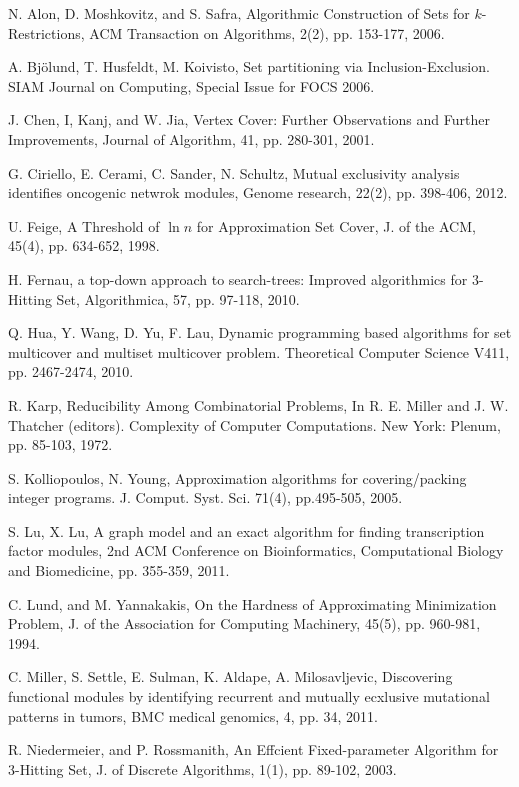 \documentclass[11pt]{article}
\begin{document}
\begin{thebibliography}{10}

N. Alon, D. Moshkovitz, and S. Safra, Algorithmic Construction of
Sets for $k$-Restrictions, ACM Transaction on Algorithms, 2(2),
pp. 153-177, 2006.

A. Bj\"olund, T. Husfeldt, M. Koivisto, Set partitioning via
Inclusion-Exclusion. SIAM Journal on Computing, Special Issue for
FOCS 2006.

J. Chen, I, Kanj, and W. Jia, Vertex Cover: Further Observations
and Further Improvements, Journal of Algorithm, 41, pp. 280-301,
2001.

G. Ciriello, E. Cerami, C. Sander, N. Schultz, Mutual exclusivity
analysis identifies oncogenic netwrok modules, Genome research,
22(2), pp. 398-406, 2012.

U. Feige, A Threshold of $\ln n$ for Approximation Set Cover, J.
of the ACM, 45(4), pp. 634-652, 1998.

H. Fernau, a top-down approach to search-trees: Improved
algorithmics for $3$-Hitting Set, Algorithmica, 57, pp. 97-118,
2010.

Q. Hua, Y. Wang, D. Yu, F. Lau, Dynamic programming based
algorithms for set multicover and multiset multicover problem.
Theoretical Computer Science V411, pp. 2467-2474, 2010.

R. Karp, Reducibility Among Combinatorial Problems, In R. E.
Miller and J. W. Thatcher (editors). Complexity of Computer
Computations. New York: Plenum, pp. 85-103, 1972.

S. Kolliopoulos, N. Young, Approximation algorithms for
covering/packing integer programs. J. Comput. Syst. Sci. 71(4),
pp.495-505, 2005.

S. Lu, X. Lu, A graph model and an exact algorithm for finding
transcription factor modules, 2nd ACM Conference on
Bioinformatics, Computational Biology and Biomedicine, pp.
355-359, 2011.

C. Lund, and M. Yannakakis, On the Hardness of Approximating
Minimization Problem, J. of the Association for Computing
Machinery, 45(5), pp. 960-981, 1994.

C. Miller, S. Settle, E. Sulman, K. Aldape, A. Milosavljevic,
Discovering functional modules by identifying recurrent and
mutually ecxlusive mutational patterns in tumors, BMC medical
genomics, 4, pp. 34, 2011.

R. Niedermeier, and P. Rossmanith, An Effcient Fixed-parameter
Algorithm for 3-Hitting Set, J. of Discrete Algorithms, 1(1), pp.
89-102, 2003.

\end{thebibliography}
\end{document}

